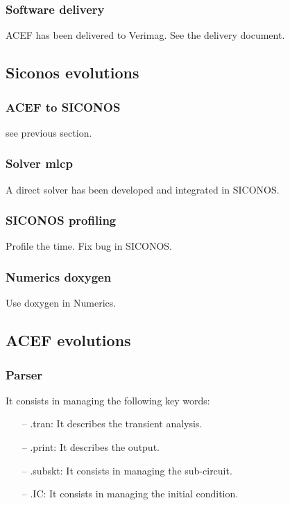 \subsubsection{Software delivery}

ACEF has been delivered to Verimag. See the delivery document.

\subsection{Siconos evolutions}

\subsubsection{ACEF to SICONOS}
see previous section.

\subsubsection{Solver mlcp}
A direct solver has been developed and integrated in SICONOS.

\subsubsection{SICONOS profiling}
Profile the time. Fix bug in SICONOS.

\subsubsection{Numerics doxygen}
Use doxygen in Numerics.

\subsection{ACEF evolutions}

\subsubsection{Parser}
It consists in managing the following key words:\\
 \begin{itemize}
  \item[--] .tran: It describes the transient analysis.
  \item[--] .print: It describes the output.
  \item[--] .subskt: It consists in managing the sub-circuit.
  \item[--] .IC: It consists in managing the initial condition.
\end{itemize}
